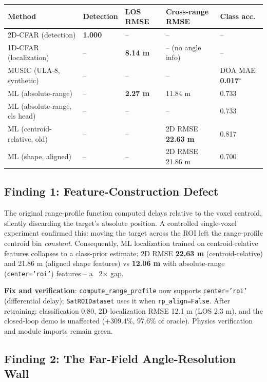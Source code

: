 \documentclass[11pt]{article}
\begin{document}
\begin{table}[ht]
\centering
\small
\begin{tabular}{lllll}
Method & Detection & LOS RMSE & Cross-range RMSE & Class acc. \\
\hline
2D-CFAR (detection) & \textbf{1.000} & -- & -- & -- \\
1D-CFAR (localization) & -- & \textbf{8.14 m} & -- (no angle info) & -- \\
MUSIC (ULA-8, synthetic) & -- & -- & -- & DOA MAE \textbf{0.017$^\circ$} \\
ML (absolute-range) & -- & \textbf{2.27 m} & 11.84 m & 0.733 \\
ML (absolute-range, cls head) & -- & -- & -- & 0.733 \\
ML (centroid-relative, old) & -- & -- & 2D RMSE \textbf{22.63 m} & 0.817 \\
ML (shape, aligned) & -- & -- & 2D RMSE 21.86 m & 0.700 \\
\hline
\end{tabular}
\end{table}

\subsection{Finding 1: Feature-Construction Defect}

The original range-profile function computed delays relative to the voxel centroid, silently discarding the target's absolute position. A controlled single-voxel experiment confirmed this: moving the target across the ROI left the range-profile centroid bin \textit{constant}. Consequently, ML localization trained on centroid-relative features collapses to a class-prior estimate: 2D RMSE \textbf{22.63 m} (centroid-relative) and 21.86 m (aligned shape features) vs \textbf{12.06 m} with absolute-range (\texttt{center='roi'}) features -- a ~2$\times$ gap.

\textbf{Fix and verification}: \texttt{compute\_range\_profile} now supports \texttt{center='roi'} (differential delay); \texttt{SatROIDataset} uses it when \texttt{rp\_align=False}. After retraining: classification 0.80, 2D localization RMSE 12.1 m (LOS 2.3 m), and the closed-loop demo is unaffected (+309.4\%, 97.6\% of oracle). Physics verification and module imports remain green.

\subsection{Finding 2: The Far-Field Angle-Resolution Wall}
\end{document}
